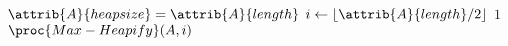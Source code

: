 \begin{codebox}
\li $\attrib{A}{heapsize} = \attrib{A}{length}$
\li \For $i \gets \floor{\attrib{A}{length}/2}$ \Downto $1$
\li	\Do
		$\proc{Max-Heapify}(A,i)$
	\End
\end{codebox}